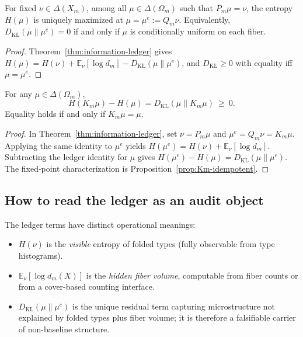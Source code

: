 \begin{corollary}\label{cor:maxent-lift}
For fixed $\nu\in\Delta(X_m)$, among all $\mu\in\Delta(\Omega_m)$ such that $P_m\mu=\nu$, the entropy $H(\mu)$ is uniquely maximized at $\mu=\mu^e:=Q_m\nu$.
Equivalently, $D_{\mathrm{KL}}(\mu\|\mu^e)=0$ if and only if $\mu$ is conditionally uniform on each fiber.
\end{corollary}

\begin{proof}
Theorem~\ref{thm:information-ledger} gives
\(
H(\mu)=H(\nu)+\mathbb{E}_\nu[\log d_m]-D_{\mathrm{KL}}(\mu\|\mu^e)
\),
and $D_{\mathrm{KL}}\ge 0$ with equality iff $\mu=\mu^e$.
\end{proof}

\begin{corollary}\label{cor:entropy-increase-equals-kl}
For any $\mu\in\Delta(\Omega_m)$,
\[
\boxed{\;
H(K_m\mu)-H(\mu)=D_{\mathrm{KL}}(\mu\|K_m\mu)\ \ge\ 0.
\;}
\]
Equality holds if and only if $K_m\mu=\mu$.
\end{corollary}

\begin{proof}
In Theorem~\ref{thm:information-ledger}, set $\nu=P_m\mu$ and $\mu^e=Q_m\nu=K_m\mu$.
Applying the same identity to $\mu^e$ yields
\(
H(\mu^e)=H(\nu)+\mathbb{E}_{\nu}[\log d_m].
\)
Subtracting the ledger identity for $\mu$ gives $H(\mu^e)-H(\mu)=D_{\mathrm{KL}}(\mu\|\mu^e)$.
The fixed-point characterization is Proposition~\ref{prop:Km-idempotent}.
\end{proof}

\subsection{How to read the ledger as an audit object}\label{subsec:ledger-audit}
The ledger terms have distinct operational meanings:
\begin{itemize}
  \item $H(\nu)$ is the \emph{visible} entropy of folded types (fully observable from type histograms).
  \item $\mathbb{E}_\nu[\log d_m(X)]$ is the \emph{hidden fiber volume}, computable from fiber counts or from a cover-based counting interface.
  \item $D_{\mathrm{KL}}(\mu\|\mu^e)$ is the unique residual term capturing microstructure not explained by folded types plus fiber volume; it is therefore a falsifiable carrier of non-baseline structure.
\end{itemize}

